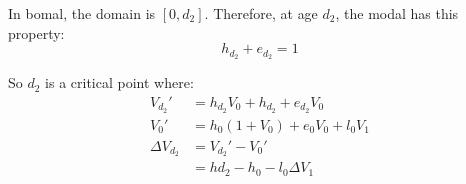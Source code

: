 \documentclass[12pt, letterpaper]{article}
\begin{document}
In bomal, the domain is $[0,d_2]$. Therefore, at age $d_2$, the modal has this property:
\begin{equation}
h_{d_2} + e_{d_2} = 1
\end{equation}

So $d_2$ is a critical point where:
\begin{equation}
\begin{aligned}
V_{d_2}' & = h_{d_2} V_0 + h_{d_2} + e_{d_2} V_0 \\
V_0' & = h_0 (1+V_0) + e_0 V_0 + l_0 V_1 \\
\Delta V_{d_2} & = V_{d_2}' - V_0' \\
& = h{d_2} - h_0 - l_0 \Delta V_1
\end{aligned}
\end{equation}

{}

\end{document}
